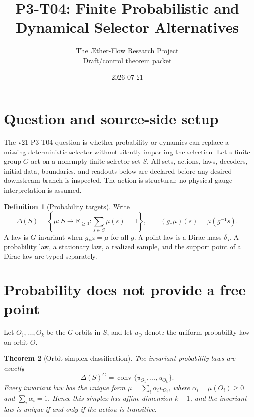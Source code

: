 \documentclass[11pt]{article}
\title{P3-T04: Finite Probabilistic and Dynamical Selector Alternatives}
\author{The \AE ther-Flow Research Project\\Draft/control theorem packet}
\date{2026-07-21}
\newtheorem{theorem}{Theorem}
\theoremstyle{definition}
\newtheorem{definition}[theorem]{Definition}
\begin{document}
\maketitle

\begin{center}
\end{center}

\section{Question and source-side setup}

The v21 P3-T04 question is whether probability or dynamics can replace a
missing deterministic selector without silently importing the selection.
Let a finite group \(G\) act on a nonempty finite selector set \(S\).  All
sets, actions, laws, decoders, initial data, boundaries, and readouts below
are declared before any desired downstream branch is inspected.  The action
is structural; no physical-gauge interpretation is assumed.

\begin{definition}[Probability targets]
Write
\[
 \Delta(S)=\left\{\mu:S\to\mathbb R_{\geq0}:\sum_{s\in S}\mu(s)=1\right\},
 \qquad (g_*\mu)(s)=\mu(g^{-1}s).
\]
A law is \(G\)-invariant when \(g_*\mu=\mu\) for all \(g\).  A point
law is a Dirac mass \(\delta_s\).  A probability law, a stationary law, a
realized sample, and the support point of a Dirac law are typed separately.
\end{definition}

\section{Probability does not provide a free point}

Let \(O_1,\ldots,O_k\) be the \(G\)-orbits in \(S\), and let \(u_O\)
denote the uniform probability law on orbit \(O\).

\begin{theorem}[Orbit-simplex classification]\label{thm:orbit-simplex}
The invariant probability laws are exactly
\[
 \Delta(S)^G=\operatorname{conv}\{u_{O_1},\ldots,u_{O_k}\}.
\]
Every invariant law has the unique form
\(\mu=\sum_i\alpha_i u_{O_i}\), where
\(\alpha_i=\mu(O_i)\geq0\) and \(\sum_i\alpha_i=1\).  Hence this
simplex has affine dimension \(k-1\), and the invariant law is unique if and
only if the action is transitive.
\end{theorem}
\end{document}
